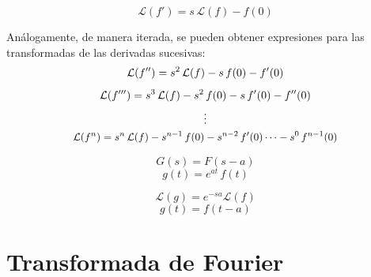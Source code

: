 \begin{mdframed}[style=PropertyFrame]
    \begin{prop}
    \end{prop}
    \begin{equation*}
        \mathcal{L}(f') = s \, \mathcal{L}(f) - f(0)
    \end{equation*}
\end{mdframed}

Análogamente, de manera iterada, se pueden obtener expresiones para las transformadas de las derivadas sucesivas:
\begin{gather*}
    \mathcal{L}(f'') = s^2 \, \mathcal{L}(f) - s \, f(0) - f'(0)
    \\[1ex]
    \mathcal{L}(f''') = s^3 \, \mathcal{L}(f) - s^2 \, f(0) - s \, f'(0) - f''(0)
    \\
    \vdots
    \\
    \scale{0.95}{
    \mathcal{L}(f^n) = s^\nth \,\mathcal{L}(f) - s^{\nth-1} \, f(0) - s^{\nth-2} \, f'(0) \dots - s^0 \, f^{\nth-1}(0)
    }
\end{gather*}

\begin{mdframed}[style=PropertyFrame]
    \begin{prop}
    \end{prop}
    \begin{equation*}
        G(s) = F(s-a)
    \end{equation*}
    \begin{equation*}
        g(t) = e^{at} \, f(t)
    \end{equation*}
\end{mdframed}

\begin{mdframed}[style=PropertyFrame]
    \begin{prop}
    \end{prop}
    \begin{equation*}
        \mathcal{L}(g)=e^{-sa}\mathcal{L}(f)
    \end{equation*}
    \begin{equation*}
        g(t) = f(t-a)
    \end{equation*}
\end{mdframed}


\section{Transformada de Fourier}

